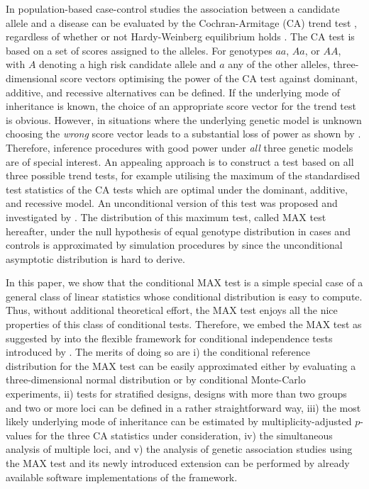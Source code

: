\documentclass[bimj,fleqn]{w-art}
\begin{document}
In population-based case-control studies the association between a 
candidate allele and a disease can be evaluated by the Cochran-Armitage 
(CA) trend test \citep{Armitage:1955}, regardless of
whether or not Hardy-Weinberg equilibrium holds 
\citep{Sasieni:1997}. 
The CA test is based on a set of scores assigned to the alleles. 
For genotypes $aa$, $Aa$, or $AA$, with $A$ denoting a high risk 
candidate allele and $a$ any of the other alleles, 
three-dimensional score vectors optimising the power of the CA test
against dominant, additive, and recessive alternatives can be defined. 
If the underlying mode of inheritance is known, the choice of
an appropriate score vector for the trend test is obvious. 
However, in situations where the underlying genetic model is unknown
choosing the \textit{wrong} score vector leads to a substantial loss of power
as shown by \citet{Freidlin:2002}.
Therefore, inference procedures
with good power under \textit{all} three genetic models 
are of special interest.
An appealing approach is to construct a test based on all three possible
trend tests, for example utilising the maximum of the standardised 
test statistics of the CA tests which are optimal under the dominant, 
additive, and recessive model.
An unconditional version of this test was proposed and investigated by \citet{Freidlin:2002}. 
The distribution of this maximum test, called MAX test hereafter,
under the null hypothesis of equal genotype distribution
in cases and controls is approximated by simulation procedures
by \citet{Freidlin:2002}
since the unconditional asymptotic distribution is hard to derive.

In this paper, we show that the conditional MAX test is a simple special
case of a general class of linear statistics whose conditional
distribution is easy to compute. Thus, without additional
theoretical effort, the MAX test enjoys all the nice properties
of this class of conditional tests. Therefore, we embed the MAX test as suggested by 
\citet{Freidlin:2002} into the flexible framework for 
conditional independence tests introduced by 
\citet{StrasserWeber1999}. The merits of doing so are
i) the conditional reference distribution for the MAX test can be easily 
approximated either by evaluating a three-dimensional normal distribution
or by conditional Monte-Carlo experiments,
ii) tests for stratified designs, designs with more than two
groups and two or more loci can be defined in a rather 
straightforward way, iii) the most likely underlying
mode of inheritance can be estimated by
multiplicity-adjusted $p$-values for the
three CA statistics under consideration, iv) the simultaneous analysis
of multiple loci, and v) the analysis of 
genetic association studies using the MAX test and its newly
introduced extension can be performed by already
available software implementations of the 
\citet{StrasserWeber1999} framework.
\end{document}

